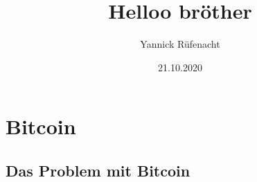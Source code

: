 \documentclass[a4paper, 12pt]{report}
\begin{document}
\title{\Large{\textbf{Helloo bröther}}}
\author{Yannick Rüfenacht}
\date{21.10.2020}

\maketitle
\tableofcontents

\chapter{Bitcoin}
\section{Das Problem mit Bitcoin}
\blindtext[5]
\end{document}
